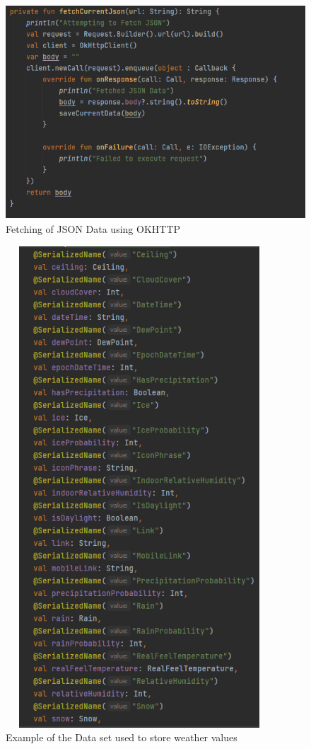\begin{figure}[H]
    \centering
    \includegraphics[width=12cm,height = 8cm]{img/DataFetch.PNG}
    \caption{Fetching of JSON Data using OKHTTP}
    \label{fig:altas config}
\end{figure}

\begin{figure}[H]
    \centering
    \includegraphics[width=10cm,height = 18cm]{img/DataExample.PNG}
    \caption{Example of the Data set used to store weather values}
    \label{fig:altas config}
\end{figure}

